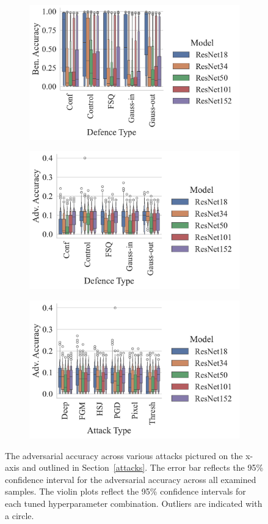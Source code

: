 \label{results}
\begin{figure}[!h]
\centering
\begin{subfigure}
    \centering
    \includegraphics[trim={7pt 10pt 20pt 0pt},clip,width=.40\textwidth]{plots/ben_accuracy_vs_defence_type.pdf}
\end{subfigure}
\begin{subfigure}
    \centering
    \includegraphics[trim={7pt 10pt 20pt pt 0pt},clip,width=.40\textwidth]{plots/adv_accuracy_vs_defence_type.pdf}
\end{subfigure}
\begin{subfigure}
    \centering
    \includegraphics[trim={7pt 10pt 20pt pt 0pt},clip,width=.40\textwidth]{plots/adv_accuracy_vs_attack_type.pdf}
\end{subfigure}
\caption{The adversarial accuracy across various attacks pictured on the x-axis and outlined in Section~\ref{attacks}. The error bar reflects the 95\% confidence interval for the adversarial accuracy across all examined samples. The violin plots reflect the 95\% confidence intervals for each tuned hyperparameter combination. Outliers are indicated with a circle.}
\label{fig:accuracies}
\end{figure}



